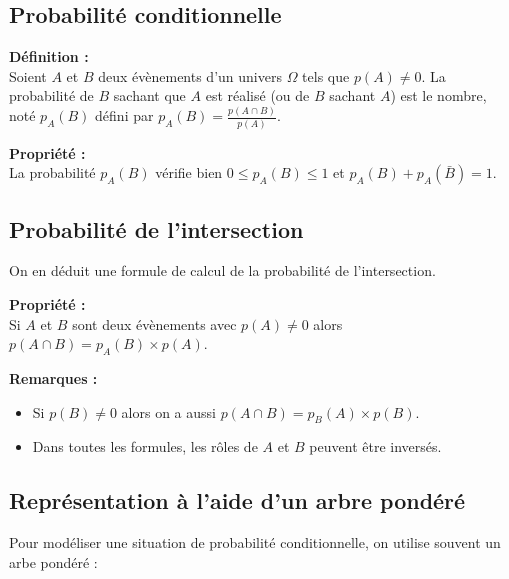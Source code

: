 \documentclass{article}
\begin{document}
\subsection{Probabilité conditionnelle}

\begin{mdframed}[style=definitionStyle]
	\textbf{Définition :} ~\\
	Soient $A$ et $B$ deux évènements d'un univers $\Omega$ tels que $p(A)\not= 0$.
	La probabilité de $B$ sachant que $A$ est réalisé (ou de $B$ sachant $A$) est le nombre, noté $p_A(B)$ défini par $\displaystyle{}p_A(B)=\frac{p(A\cap B)}{p(A)}$.
\end{mdframed}

\begin{mdframed}[style=proprieteStyle]
	\textbf{Propriété :} ~\\
	La probabilité $p_A(B)$ vérifie bien $0\leq p_A(B)\leq1$ et $p_A(B)+p_A(\bar B)=1$.
\end{mdframed}

\subsection{Probabilité de l'intersection}

On en déduit une formule de calcul de la probabilité de l'intersection.

\begin{mdframed}[style=proprieteStyle]
	\textbf{Propriété :} ~\\
	Si $A$ et $B$ sont deux évènements avec $p(A)\not=0$ alors $p(A\cap B)=p_A(B)\times p(A)$.
\end{mdframed}

\textbf{Remarques :}
\vspace{-3pt}
\begin{itemize}
	\item Si $p(B)\not=0$ alors on a aussi $p(A\cap B)=p_B(A)\times p(B)$.
	\item Dans toutes les formules, les rôles de $A$ et $B$ peuvent être inversés.
\end{itemize}

\subsection{Représentation à l'aide d'un arbre pondéré}

Pour modéliser une situation de probabilité conditionnelle, on utilise souvent un arbe pondéré : \\
\end{document}
